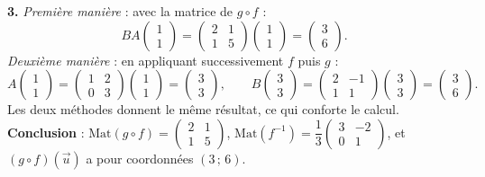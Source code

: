 \documentclass[11pt]{article}
\begin{document}
\begin{exoresolu}
\textbf{3.} \emph{Première manière} : avec la matrice de $g\circ f$ :
\[ BA\begin{pmatrix} 1 \\ 1 \end{pmatrix}=\begin{pmatrix} 2 & 1 \\ 1 & 5 \end{pmatrix}\begin{pmatrix} 1 \\ 1 \end{pmatrix}=\begin{pmatrix} 3 \\ 6 \end{pmatrix}. \]
\emph{Deuxième manière} : en appliquant successivement $f$ puis $g$ :
\[ A\begin{pmatrix} 1 \\ 1 \end{pmatrix}=\begin{pmatrix} 1 & 2 \\ 0 & 3 \end{pmatrix}\begin{pmatrix} 1 \\ 1 \end{pmatrix}=\begin{pmatrix} 3 \\ 3 \end{pmatrix}, \qquad B\begin{pmatrix} 3 \\ 3 \end{pmatrix}=\begin{pmatrix} 2 & -1 \\ 1 & 1 \end{pmatrix}\begin{pmatrix} 3 \\ 3 \end{pmatrix}=\begin{pmatrix} 3 \\ 6 \end{pmatrix}. \]
Les deux méthodes donnent le même résultat, ce qui conforte le calcul.
\textbf{Conclusion} : $\mathrm{Mat}(g\circ f)=\begin{pmatrix} 2 & 1 \\ 1 & 5 \end{pmatrix}$, $\mathrm{Mat}(f^{-1})=\dfrac{1}{3}\begin{pmatrix} 3 & -2 \\ 0 & 1 \end{pmatrix}$, et $(g\circ f)(\vec{u})$ a pour coordonnées $(3\,;\,6)$.
\end{exoresolu}
\end{document}
